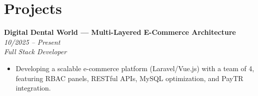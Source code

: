 \section{Projects}

\textbf{Digital Dental World — Multi-Layered E-Commerce Architecture} \hfill \textit{10/2025 -- Present} \\
\textit{Full Stack Developer}
\begin{itemize}[leftmargin=1.5em, itemsep=0pt, topsep=2pt]
  \item Developing a scalable e-commerce platform (Laravel/Vue.js) with a team of 4, featuring RBAC panels, RESTful APIs, MySQL optimization, and PayTR integration.
\end{itemize}
